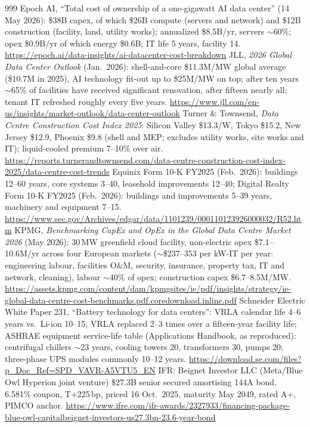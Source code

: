 \begin{thebibliography}{999}
 Epoch AI, ``Total cost of ownership of a one-gigawatt AI data center'' (14 May 2026): \$38B capex, of which \$26B compute (servers and network) and \$12B construction (facility, land, utility works); annualized \$8.5B/yr, servers $\sim$60\%; opex \$0.9B/yr of which energy \$0.6B; IT life 5 years, facility 14. \url{https://epoch.ai/data-insights/ai-datacenter-cost-breakdown}
 JLL, \emph{2026 Global Data Center Outlook} (Jan.\ 2026): shell-and-core \$11.3M/MW global average (\$10.7M in 2025), AI technology fit-out up to \$25M/MW on top; after ten years $\sim$65\% of facilities have received significant renovation, after fifteen nearly all; tenant IT refreshed roughly every five years. \url{https://www.jll.com/en-us/insights/market-outlook/data-center-outlook}
 Turner \& Townsend, \emph{Data Centre Construction Cost Index 2025}: Silicon Valley \$13.3/W, Tokyo \$15.2, New Jersey \$12.9, Phoenix \$9.8 (shell and MEP; excludes utility works, site works and IT); liquid-cooled premium 7--10\% over air. \url{https://reports.turnerandtownsend.com/data-centre-construction-cost-index-2025/data-centre-cost-trends}
 Equinix Form 10-K FY2025 (Feb.\ 2026): buildings 12--60 years, core systems 3--40, leasehold improvements 12--40; Digital Realty Form 10-K FY2025 (Feb.\ 2026): buildings and improvements 5--39 years, machinery and equipment 7--15. \url{https://www.sec.gov/Archives/edgar/data/1101239/000110123926000032/R52.htm}
 KPMG, \emph{Benchmarking CapEx and OpEx in the Global Data Centre Market 2026} (May 2026): 30\,MW greenfield cloud facility, non-electric opex \$7.1--10.6M/yr across four European markets ($\sim$\$237--353 per kW-IT per year: engineering labour, facilities O\&M, security, insurance, property tax, IT and network, cleaning), labour $\sim$40\% of opex; construction capex \$6.7--8.5M/MW. \url{https://assets.kpmg.com/content/dam/kpmgsites/ie/pdf/insights/strategy/ie-global-data-centre-cost-benchmarks.pdf.coredownload.inline.pdf}
 Schneider Electric White Paper 231, ``Battery technology for data centers'': VRLA calendar life 4--6 years vs.\ Li-ion 10--15, VRLA replaced 2--3 times over a fifteen-year facility life; ASHRAE equipment service-life table (Applications Handbook, as reproduced): centrifugal chillers $\sim$23 years, cooling towers 20, transformers 30, pumps 20; three-phase UPS modules commonly 10--12 years. \url{https://download.se.com/files?p_Doc_Ref=SPD_VAVR-A5VTU5_EN}
 IFR: Beignet Investor LLC (Meta/Blue Owl Hyperion joint venture) \$27.3B senior secured amortising 144A bond, 6.581\% coupon, T+225\,bp, priced 16 Oct.\ 2025, maturity May 2049, rated A+, PIMCO anchor. \url{https://www.ifre.com/ifr-awards/2327933/financing-package-blue-owl-capitalbeignet-investors-us27.3bn-23.6-year-bond}

\end{thebibliography}
